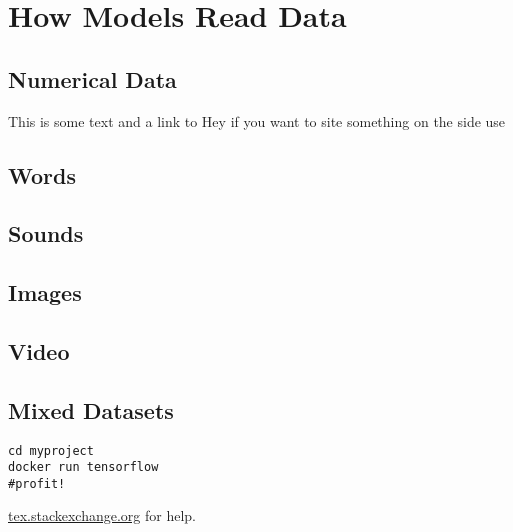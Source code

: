 \setchapterpreamble[u]{\margintoc}
\chapter{How Models Read Data}

\section{Numerical Data}

This is some text and a link to 
Hey if you want to site something on the side use


\section{Words}
\section{Sounds}
\section{Images}
\section{Video}
\section{Mixed Datasets}


\begin{lstlisting}[style=kaolstplain,linewidth=1.5\textwidth]
cd myproject
docker run tensorflow
#profit!
\end{lstlisting}

\url{tex.stackexchange.org} for help.
